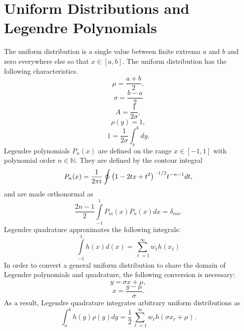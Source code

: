 \section{Uniform Distributions and Legendre Polynomials}
The uniform distribution is a single value between finite extrema $a$ and $b$ and zero everywhere else so that
$x\in[a,b]$. The uniform distribution has the following characteristics.
\begin{equation}
  \mu = \frac{a+b}{2},
\end{equation}
\begin{equation}
  \sigma = \frac{b-a}{2}
\end{equation}
\begin{equation}
  A = \frac{1}{2\sigma},
\end{equation}
\begin{equation}
  \rho(y)=1,
\end{equation}
\begin{equation}
  1 = \frac{1}{2\sigma}\int_a^b dy.
\end{equation}
Legendre polynomials $P_n(x)$ are defined on the range $x\in[-1,1]$ with polynomial order $n\in\mathbb{N}$.  
They are defined by the contour integral \cite{polys}
\begin{equation}
  P_n(x) = \frac{1}{2\pi i}\oint\qty(1-2tx + t^2)^{-1/2}t^{-n-1} dt,
\end{equation}
and are made orthonormal as
\begin{equation}
  \frac{2n-1}{2}\int\limits_{-1}^1 P_m(x)P_n(x) dx = \delta_{mn}.
\end{equation}
Legendre quadrature approximates the following integrals:
\begin{equation}
 \int\limits_{-1}^1 h(x)d(x) = \sum_{\ell=1}^\infty w_\ell h(x_\ell)
\end{equation}
In order to convert a general uniform distribution to share the domain of Legendre polynomials and quadrature,
the following conversion is necessary:
\begin{equation}
  y = \sigma x+\mu,
\end{equation}
\begin{equation}
  x = \frac{y-\mu}{\sigma}.
\end{equation}
As a result, Legendre quadrature integrates arbitrary uniform distributions as
\begin{equation}
  \int_a^b h(y)\rho(y)dy =\frac{1}{2} \sum_{\ell=1}^\infty w_\ell h(\sigma x_\ell+\mu).
\end{equation}


